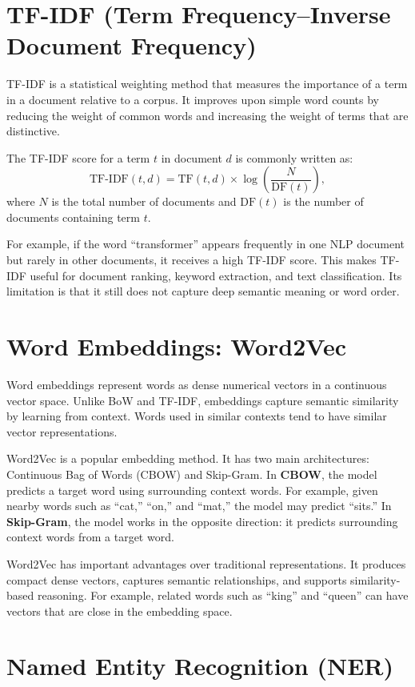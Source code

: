 \documentclass[10pt]{article}
\begin{document}
\section{TF-IDF (Term Frequency--Inverse Document Frequency)}

TF-IDF is a statistical weighting method that measures the importance of a term in a document relative to a corpus. It improves upon simple word counts by reducing the weight of common words and increasing the weight of terms that are distinctive.

The TF-IDF score for a term $t$ in document $d$ is commonly written as:
\[
\mathrm{TF\text{-}IDF}(t,d)=\mathrm{TF}(t,d)\times \log\left(\frac{N}{\mathrm{DF}(t)}\right),
\]
where $N$ is the total number of documents and $\mathrm{DF}(t)$ is the number of documents containing term $t$.

For example, if the word ``transformer'' appears frequently in one NLP document but rarely in other documents, it receives a high TF-IDF score. This makes TF-IDF useful for document ranking, keyword extraction, and text classification. Its limitation is that it still does not capture deep semantic meaning or word order.

\section{Word Embeddings: Word2Vec}

Word embeddings represent words as dense numerical vectors in a continuous vector space. Unlike BoW and TF-IDF, embeddings capture semantic similarity by learning from context. Words used in similar contexts tend to have similar vector representations.

Word2Vec is a popular embedding method. It has two main architectures: Continuous Bag of Words (CBOW) and Skip-Gram. In \textbf{CBOW}, the model predicts a target word using surrounding context words. For example, given nearby words such as ``cat,'' ``on,'' and ``mat,'' the model may predict ``sits.'' In \textbf{Skip-Gram}, the model works in the opposite direction: it predicts surrounding context words from a target word.

Word2Vec has important advantages over traditional representations. It produces compact dense vectors, captures semantic relationships, and supports similarity-based reasoning. For example, related words such as ``king'' and ``queen'' can have vectors that are close in the embedding space.

\section{Named Entity Recognition (NER)}
\end{document}
